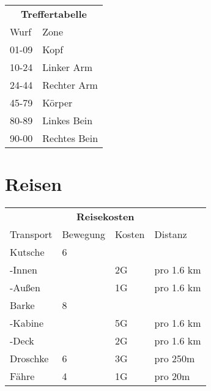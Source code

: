 \documentclass[a4paper, fontsize=10pt twocolumn]{scrartcl}
\begin{document}
\begin{table}[!ht]
    \centering
    \begin{tabularx}{\textwidth}{l|l}
        \multicolumn{2}{c}{\cellcolor{gray!25} \textbf{Treffertabelle}} \\ \cline{1-2}
        Wurf  & Zone                                                    \\ \cline{1-2}
        01-09 & Kopf                                                    \\
        10-24 & Linker Arm                                              \\
        24-44 & Rechter Arm                                             \\
        45-79 & Körper                                                  \\
        80-89 & Linkes Bein                                             \\
        90-00 & Rechtes Bein
    \end{tabularx}
\end{table}

\clearpage
\section{Reisen}
\begin{table}[!ht]
    \centering
    \begin{tabularx}{\textwidth}{l|l|l|l}
        \multicolumn{4}{c}{\cellcolor{gray!25} \textbf{Reisekosten}} \\ \cline{1-4}
        Transport & Bewegung & Kosten & Distanz                      \\ \cline{1-4}
        Kutsche   & 6        &        &                              \\
        -Innen    &          & 2G     & pro 1.6 km                   \\
        -Außen    &          & 1G     & pro 1.6 km                   \\
        Barke     & 8        &        &                              \\
        -Kabine   &          & 5G     & pro 1.6 km                   \\
        -Deck     &          & 2G     & pro 1.6 km                   \\
        Droschke  & 6        & 3G     & pro 250m                     \\
        Fähre     & 4        & 1G     & pro 20m
    \end{tabularx}
\end{table}
\end{document}
